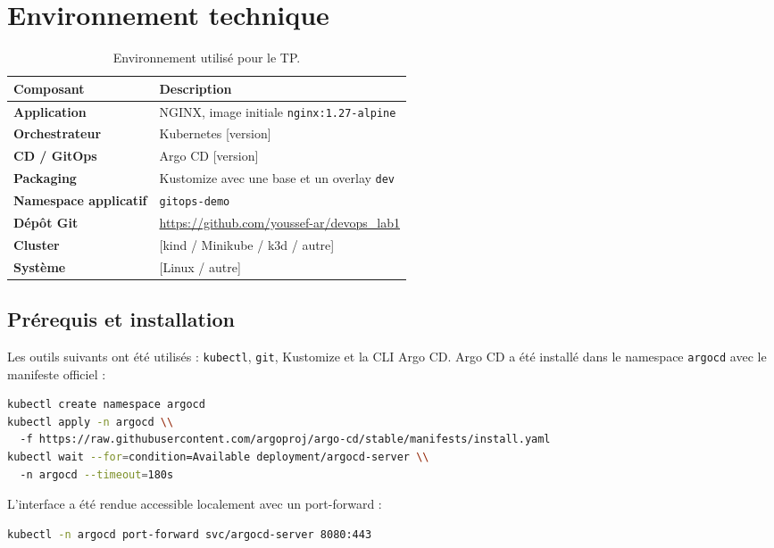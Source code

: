 \documentclass[11pt,a4paper]{article}
\newcommand{\code}[1]{\texttt{#1}}
\begin{document}
\section{Environnement technique}

\begin{table}[H]
\centering
\begin{tabularx}{\textwidth}{>{\bfseries}l X}
\toprule
Composant & Description \\
\midrule
Application & NGINX, image initiale \code{nginx:1.27-alpine} \\
Orchestrateur & Kubernetes [version] \\
CD / GitOps & Argo CD [version] \\
Packaging & Kustomize avec une base et un overlay \code{dev} \\
Namespace applicatif & \code{gitops-demo} \\
Dépôt Git & \url{https://github.com/youssef-ar/devops_lab1} \\
Cluster & [kind / Minikube / k3d / autre] \\
Système & [Linux / autre] \\
\bottomrule
\end{tabularx}
\caption{Environnement utilisé pour le TP.}
\end{table}

\subsection{Prérequis et installation}

Les outils suivants ont été utilisés : \code{kubectl}, \code{git}, Kustomize et la CLI Argo CD. Argo CD a été installé dans le namespace \code{argocd} avec le manifeste officiel :

\begin{lstlisting}[language=bash]
kubectl create namespace argocd
kubectl apply -n argocd \\
  -f https://raw.githubusercontent.com/argoproj/argo-cd/stable/manifests/install.yaml
kubectl wait --for=condition=Available deployment/argocd-server \\
  -n argocd --timeout=180s
\end{lstlisting}

L'interface a été rendue accessible localement avec un port-forward :

\begin{lstlisting}[language=bash]
kubectl -n argocd port-forward svc/argocd-server 8080:443
\end{lstlisting}
\end{document}
